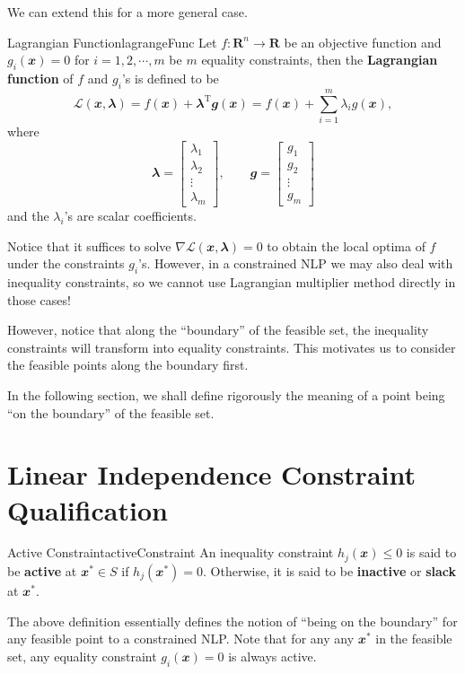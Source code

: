 \documentclass[math, code]{amznotes}
\theoremstyle{remark}
\begin{document}
We can extend this for a more general case.
\begin{dfnbox}{Lagrangian Function}{lagrangeFunc}
    Let $f \colon \mathbf{R}^n \to \mathbf{R}$ be an objective function and $g_i(\mathbfit{x}) = 0$ for $i = 1, 2, \cdots, m$ be $m$ equality constraints, then the {\color{red} \textbf{Lagrangian function}} of $f$ and $g_i$'s is defined to be
    \begin{equation*}
        \mathcal{L}(\mathbfit{x}, \mathbfit{\lambda}) = f(\mathbfit{x}) + \mathbfit{\lambda}^{\mathrm{T}}\mathbfit{g}(\mathbfit{x}) = f(\mathbfit{x}) + \sum_{i = 1}^{m}\lambda_i g(\mathbfit{x}),
    \end{equation*}
    where
    \begin{equation*}
        \mathbfit{\lambda} = \begin{bmatrix}
            \lambda_1 \\
            \lambda_2 \\
            \vdots \\
            \lambda_m
        \end{bmatrix}, \qquad \mathbfit{g} = \begin{bmatrix}
            g_1 \\
            g_2 \\
            \vdots \\
            g_m
        \end{bmatrix}
    \end{equation*}
    and the $\lambda_i$'s are scalar coefficients.
\end{dfnbox}
Notice that it suffices to solve $\nabla \mathcal{L}(\mathbfit{x}, \mathbfit{\lambda}) = \mathbfit{0}$ to obtain the local optima of $f$ under the constraints $g_i$'s. However, in a constrained NLP we may also deal with inequality constraints, so we cannot use Lagrangian multiplier method directly in those cases! 

However, notice that along the ``boundary'' of the feasible set, the inequality constraints will transform into equality constraints. This motivates us to consider the feasible points along the boundary first.

In the following section, we shall define rigorously the meaning of a point being ``on the boundary'' of the feasible set.
\section{Linear Independence Constraint Qualification}
\begin{dfnbox}{Active Constraint}{activeConstraint}
    An inequality constraint $h_j(\mathbfit{x}) \leq 0$ is said to be {\color{red} \textbf{active}} at $\mathbfit{x}^* \in S$ if $h_j(\mathbfit{x}^*) = 0$. Otherwise, it is said to be {\color{red} \textbf{inactive}} or {\color{red} \textbf{slack}} at $\mathbfit{x}^*$.
\end{dfnbox}
The above definition essentially defines the notion of ``being on the boundary'' for any feasible point to a constrained NLP. Note that for any any $\mathbfit{x}^*$ in the feasible set, any equality constraint $g_i(\mathbfit{x}) = 0$ is always active.
\end{document}
